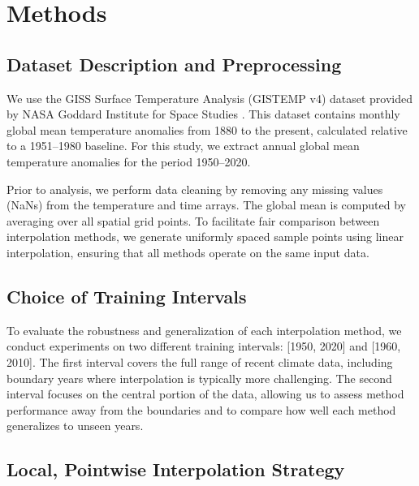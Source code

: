 \section{Methods}

\subsection{Dataset Description and Preprocessing}

We use the GISS Surface Temperature Analysis (GISTEMP v4) dataset provided by NASA Goddard Institute for Space Studies \cite{gistemp}. This dataset contains monthly global mean temperature anomalies from 1880 to the present, calculated relative to a 1951--1980 baseline. For this study, we extract annual global mean temperature anomalies for the period 1950--2020.

Prior to analysis, we perform data cleaning by removing any missing values (NaNs) from the temperature and time arrays. The global mean is computed by averaging over all spatial grid points. To facilitate fair comparison between interpolation methods, we generate uniformly spaced sample points using linear interpolation, ensuring that all methods operate on the same input data.

\subsection{Choice of Training Intervals}

To evaluate the robustness and generalization of each interpolation method, we conduct experiments on two different training intervals: [1950, 2020] and [1960, 2010]. The first interval covers the full range of recent climate data, including boundary years where interpolation is typically more challenging. The second interval focuses on the central portion of the data, allowing us to assess method performance away from the boundaries and to compare how well each method generalizes to unseen years.

\subsection{Local, Pointwise Interpolation Strategy}

